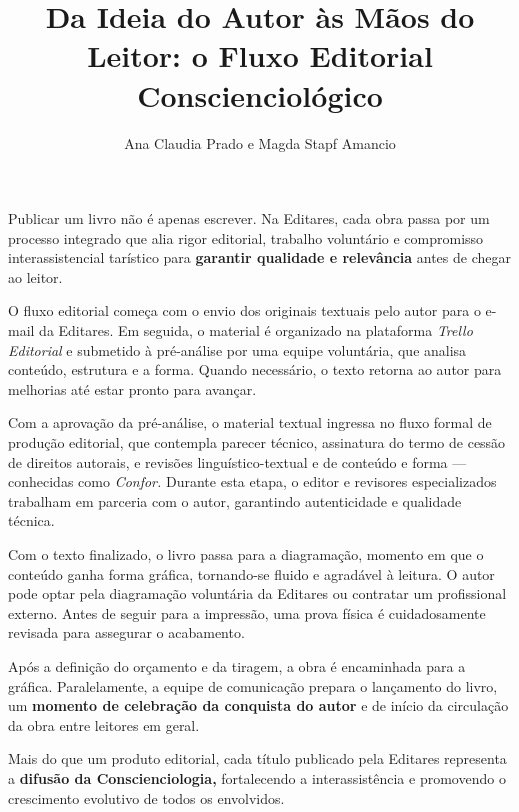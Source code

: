 \documentclass{gescons}
\author{Ana Claudia Prado e Magda Stapf Amancio}
\title{Da Ideia do Autor às Mãos do Leitor: o Fluxo Editorial Conscienciológico}
\begin{document}
    \makeentrevistatitle


    


Publicar um livro não é apenas escrever. Na Editares, cada obra passa por um processo integrado que alia rigor editorial, trabalho voluntário e compromisso interassistencial tarístico para \textbf{garantir qualidade e relevância} antes de chegar ao leitor.

O fluxo editorial começa com o envio dos originais textuais pelo autor para o e-mail da Editares. Em seguida, o material é organizado na plataforma \emph{Trello Editorial} e submetido à pré-análise por uma equipe voluntária, que analisa conteúdo, estrutura e a forma. Quando necessário, o texto retorna ao autor para melhorias até estar pronto para avançar.

Com a aprovação da pré-análise, o material textual ingressa no fluxo formal de produção editorial, que contempla parecer técnico, assinatura do termo de cessão de direitos autorais, e revisões linguístico-textual e de conteúdo e forma --- conhecidas como \emph{Confor.} Durante esta etapa, o editor e revisores especializados trabalham em parceria com o autor, garantindo autenticidade e qualidade técnica.

Com o texto finalizado, o livro passa para a diagramação, momento em que o conteúdo ganha forma gráfica, tornando-se fluido e agradável à leitura. O autor pode optar pela diagramação voluntária da Editares ou contratar um profissional externo. Antes de seguir para a impressão, uma prova física é cuidadosamente revisada para assegurar o acabamento.

Após a definição do orçamento e da tiragem, a obra é encaminhada para a gráfica. Paralelamente, a equipe de comunicação prepara o lançamento do livro, um \textbf{momento de celebração da conquista do autor} e de início da circulação da obra entre leitores em geral.

Mais do que um produto editorial, cada título publicado pela Editares representa a \textbf{difusão da Conscienciologia,} fortalecendo a interassistência e promovendo o crescimento evolutivo de todos os envolvidos.
\end{document}
